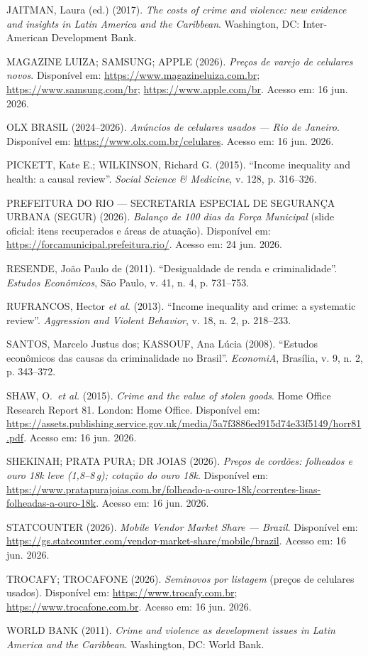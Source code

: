 \documentclass[11pt,a4paper]{article}
\begin{document}
JAITMAN, Laura (ed.) (2017). \emph{The costs of crime and violence: new evidence and insights in Latin America and the Caribbean}. Washington, DC: Inter-American Development Bank.

MAGAZINE LUIZA; SAMSUNG; APPLE (2026). \emph{Preços de varejo de celulares novos}. Disponível em: \url{https://www.magazineluiza.com.br}; \url{https://www.samsung.com/br}; \url{https://www.apple.com/br}. Acesso em: 16 jun. 2026.

OLX BRASIL (2024--2026). \emph{Anúncios de celulares usados --- Rio de Janeiro}. Disponível em: \url{https://www.olx.com.br/celulares}. Acesso em: 16 jun. 2026.

PICKETT, Kate E.; WILKINSON, Richard G. (2015). ``Income inequality and health: a causal review''. \emph{Social Science \& Medicine}, v. 128, p. 316--326.

PREFEITURA DO RIO --- SECRETARIA ESPECIAL DE SEGURANÇA URBANA (SEGUR) (2026). \emph{Balanço de 100 dias da Força Municipal} (slide oficial: itens recuperados e áreas de atuação). Disponível em: \url{https://forcamunicipal.prefeitura.rio/}. Acesso em: 24 jun. 2026.

RESENDE, João Paulo de (2011). ``Desigualdade de renda e criminalidade''. \emph{Estudos Econômicos}, São Paulo, v. 41, n. 4, p. 731--753.

RUFRANCOS, Hector \emph{et al.} (2013). ``Income inequality and crime: a systematic review''. \emph{Aggression and Violent Behavior}, v. 18, n. 2, p. 218--233.

SANTOS, Marcelo Justus dos; KASSOUF, Ana Lúcia (2008). ``Estudos econômicos das causas da criminalidade no Brasil''. \emph{EconomiA}, Brasília, v. 9, n. 2, p. 343--372.

SHAW, O.\ \emph{et al.} (2015). \emph{Crime and the value of stolen goods}. Home Office Research Report 81. London: Home Office. Disponível em: \url{https://assets.publishing.service.gov.uk/media/5a7f3886ed915d74e33f5149/horr81.pdf}. Acesso em: 16 jun. 2026.

SHEKINAH; PRATA PURA; DR JOIAS (2026). \emph{Preços de cordões: folheados e ouro 18k leve (1,8--8\,g); cotação do ouro 18k}. Disponível em: \url{https://www.pratapurajoias.com.br/folheado-a-ouro-18k/correntes-lisas-folheadas-a-ouro-18k}. Acesso em: 16 jun. 2026.

STATCOUNTER (2026). \emph{Mobile Vendor Market Share --- Brazil}. Disponível em: \url{https://gs.statcounter.com/vendor-market-share/mobile/brazil}. Acesso em: 16 jun. 2026.

TROCAFY; TROCAFONE (2026). \emph{Seminovos por listagem} (preços de celulares usados). Disponível em: \url{https://www.trocafy.com.br}; \url{https://www.trocafone.com.br}. Acesso em: 16 jun. 2026.

WORLD BANK (2011). \emph{Crime and violence as development issues in Latin America and the Caribbean}. Washington, DC: World Bank.

\endgroup
\end{document}
